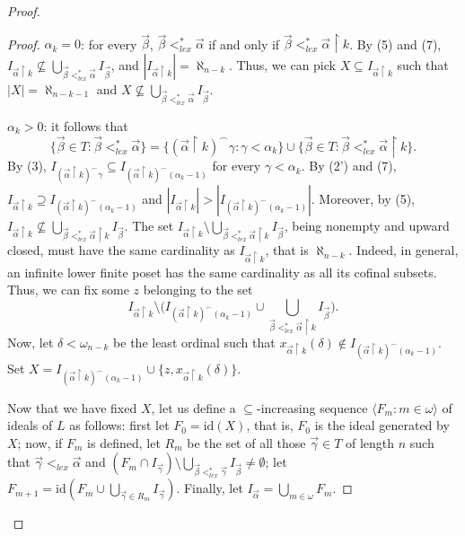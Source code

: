 \documentclass[10pt,a4paper]{amsart}
\begin{document}
\begin{proof}
\begin{proof}
\noindent \underline{$\alpha_k = 0$}:  for every $\vec{\beta}$, $\vec{\beta} <^*_{lex} \vec{\alpha}$ if and only if $\vec{\beta} <^*_{lex} \vec{\alpha} \upharpoonright k$. By (5) and (7), $I_{\vec{\alpha} \upharpoonright k} \nsubseteq \bigcup_{\vec{\beta} <^*_{lex} \vec{\alpha}}I_{\vec{\beta}}$, and $|I_{\vec{\alpha} \upharpoonright k}| = \aleph_{n-k}$. Thus, we can pick $X\subseteq I_{\vec{\alpha} \upharpoonright k}$ such that $|X| = \aleph_{n-k-1}$ and  $X \nsubseteq \bigcup_{\vec{\beta} <^*_{lex} \vec{\alpha}} I_{\vec{\beta}}$. \vspace{0.5em}

\noindent \underline{$\alpha_k > 0$}: it follows that 
\[
\{\vec{\beta} \in T : \vec{\beta} <^*_{lex} \vec{\alpha}\} = \{(\vec{\alpha} \upharpoonright k)^\smallfrown \gamma : \gamma < \alpha_k\} \cup \{\vec{\beta} \in T : \vec{\beta} <^*_{lex} \vec{\alpha}\upharpoonright k\}.
\]
 By (3), $I_{(\vec{\alpha} \upharpoonright k)^\smallfrown \gamma} \subseteq I_{(\vec{\alpha} \upharpoonright k)^\smallfrown (\alpha_k-1)}$ for every $\gamma < \alpha_k$. By (2') and (7), $I_{\vec{\alpha} \upharpoonright k} \supseteq I_{(\vec{\alpha} \upharpoonright k)^\smallfrown (\alpha_k - 1)}$ and $|I_{\vec{\alpha} \upharpoonright k}| > |I_{(\vec{\alpha} \upharpoonright k)^\smallfrown (\alpha_k - 1)}|$. Moreover, by (5), $I_{\vec{\alpha} \upharpoonright k} \nsubseteq \bigcup_{\vec{\beta} <^*_{lex} \vec{\alpha} \upharpoonright k} I_{\vec{\beta}}$. The set $I_{\vec{\alpha} \upharpoonright k} \setminus \bigcup_{\vec{\beta} <^*_{lex} \vec{\alpha} \upharpoonright k} I_{\vec{\beta}}$, being nonempty and upward closed, must have the same cardinality as $I_{\vec{\alpha} \upharpoonright k}$, that is $\aleph_{n-k}$. Indeed, in general, an infinite lower finite poset has the same cardinality as all its cofinal subsets. Thus, we can fix some $z$ belonging to the set
\[
I_{\vec{\alpha} \upharpoonright k} \setminus \Big ( I_{(\vec{\alpha} \upharpoonright k)^\smallfrown (\alpha_k - 1)} \cup \bigcup_{\vec{\beta} <^*_{lex} \vec{\alpha} \upharpoonright k} I_{\vec{\beta}} \Big).
\] 
Now, let $\delta < \omega_{n-k}$ be the least ordinal such that $
x_{\vec{\alpha} \upharpoonright k}(\delta) \not\in I_{(\vec{\alpha} \upharpoonright k)^\smallfrown (\alpha_k - 1)}$.
Set $X = I_{(\vec{\alpha} \upharpoonright k)^\smallfrown (\alpha_k - 1)} \cup \{z, x_{\vec{\alpha} \upharpoonright k}(\delta)\}$.\vspace{0.5em}


 Now that we have fixed $X$, let us define a $\subseteq$-increasing sequence $\langle F_m : m\in\omega\rangle$ of ideals of $L$ as follows: first let $F_0 = \mathrm{id}(X)$,  that is, $F_0$ is the ideal generated by $X$; now, if $F_m$ is defined, let $R_m$ be the set of all those $\vec{\gamma} \in T$ of length $n$ such that $\vec{\gamma} <_{lex} \vec{\alpha}$ and $(F_m \cap I_{\vec{\gamma}}) \setminus \bigcup_{\vec{\beta} <^*_{lex} \vec{\gamma}} I_{\vec{\beta}} \neq \emptyset$; let $F_{m+1} = \mathrm{id}(F_m \cup \bigcup_{\vec{\gamma} \in R_m} I_{\vec{\gamma}})$. Finally, let $I_{\vec{\alpha}} = \bigcup_{m\in\omega} F_m$. 
 

\end{proof}
\end{proof}
\end{document}
